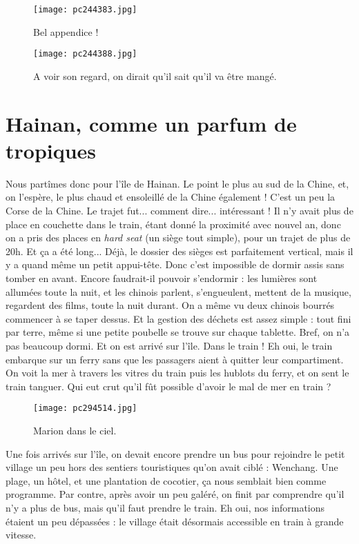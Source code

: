 \documentclass{book}
\begin{document}
\begin{figure}[h]
\centering
\texttt{[image: pc244383.jpg]}
\caption*{Bel appendice !}
\end{figure}


\begin{figure}[h]
\centering
\texttt{[image: pc244388.jpg]}
\caption*{A voir son regard, on dirait qu'il sait qu'il va être mangé.}
\end{figure}



\chapter{Hainan, comme un parfum de tropiques}
Nous partîmes donc pour l'île de Hainan. Le point le plus au sud de la Chine, et, on l'espère, le plus chaud et ensoleillé de la Chine également ! C'est un peu la Corse de la Chine. Le trajet fut... comment dire... intéressant ! Il n'y avait plus de place en couchette dans le train, étant donné la proximité avec nouvel an, donc on a pris des places en \emph{hard seat} (un siège tout simple), pour un trajet de plus de 20h. Et ça a été long... Déjà, le dossier des sièges est parfaitement vertical, mais il y a quand même un petit appui-tête. Donc c'est impossible de dormir assis sans tomber en avant. Encore faudrait-il pouvoir s'endormir : les lumières sont allumées toute la nuit, et les chinois parlent, s'engueulent, mettent de la musique, regardent des films, toute la nuit durant. On a même vu deux chinois bourrés commencer à se taper dessus. Et la gestion des déchets est assez simple : tout fini par terre, même si une petite poubelle se trouve sur chaque tablette. Bref, on n'a pas beaucoup dormi. Et on est arrivé sur l'île. Dans le train ! Eh oui, le train embarque sur un ferry sans que les passagers aient à quitter leur compartiment. On voit la mer à travers les vitres du train puis les hublots du ferry, et on sent le train tanguer. Qui eut crut qu'il fût possible d'avoir le mal de mer en train ?


\begin{figure}[h]
\centering
\texttt{[image: pc294514.jpg]}
\caption*{Marion dans le ciel.}
\end{figure}


Une fois arrivés sur l'île, on devait encore prendre un bus pour rejoindre le petit village un peu hors des sentiers touristiques qu'on avait ciblé : Wenchang. Une plage, un hôtel, et une plantation de cocotier, ça nous semblait bien comme programme. Par contre, après avoir un peu galéré, on finit par comprendre qu'il n'y a plus de bus, mais qu'il faut prendre le train. Eh oui, nos informations étaient un peu dépassées : le village était désormais accessible en train à grande vitesse.
\end{document}
